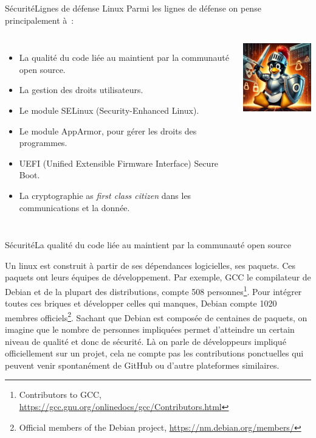 \documentclass{beamer}
\begin{document}
    \begin{frame}{Sécurité}{Lignes de défense Linux}
        Parmi les lignes de défense on pense principalement à~:
        \begin{columns}
            \begin{itemize}
                \item La qualité du code liée au maintient par la communauté open source.
                \item La gestion des droits utilisateurs.
                \item Le module SELinux (Security-Enhanced Linux).
                \item Le module AppArmor, pour gérer les droits des programmes.
                \item UEFI (Unified Extensible Firmware Interface) Secure Boot.
                \item La cryptographie as \textit{first class citizen} dans les communications et la donnée.
            \end{itemize}
            \centering
            \includegraphics[width=4cm]{image/tux-fighting-attack}
        \end{columns}
    \end{frame}

    \begin{frame}{Sécurité}{La qualité du code liée au maintient par la communauté open source}
        \begin{footnotesize}
            Un linux est construit à partir de ses dépendances logicielles, ses paquets.
            \bigbreak
            Ces paquets ont leurs équipes de développement.
            Par exemple, GCC le compilateur de Debian et de la plupart des distributions, compte 508 personnes\footnote{Contributors to GCC, \url{https://gcc.gnu.org/onlinedocs/gcc/Contributors.html}}.
            \bigbreak
            Pour intégrer toutes ces briques et développer celles qui manques, Debian compte 1020 membres officiels\footnote{Official members of the Debian project, \url{https://nm.debian.org/members/}}.
            \bigbreak
            Sachant que Debian est composée de centaines de paquets, on imagine que le nombre de personnes impliquées permet d'atteindre un certain niveau de qualité et donc de sécurité.
            \bigbreak
            Là on parle de développeurs impliqué officiellement sur un projet, cela ne compte pas les contributions ponctuelles qui peuvent venir spontanément de GitHub ou d'autre plateformes similaires.
        \end{footnotesize}
    \end{frame}
\end{document}
